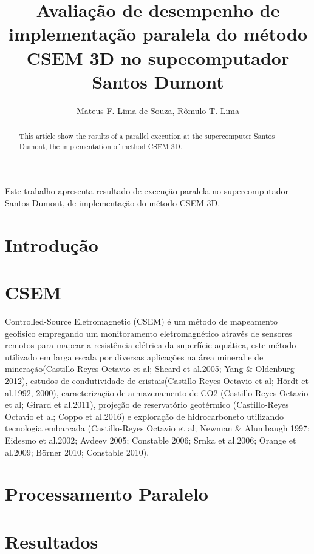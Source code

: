 \documentclass[12pt]{article}
\title{Avaliação de desempenho de implementação paralela do método CSEM 3D no supecomputador Santos Dumont}
\author{Mateus F. Lima de Souza\inst{1,2}, Rômulo T. Lima\inst{1,3}}
\begin{document}
 

\maketitle

\begin{abstract}
  This article show the results of a parallel execution at the supercomputer Santos Dumont, the implementation of method CSEM 3D.
\end{abstract}
     
\begin{resumo} 
  Este trabalho apresenta resultado de execução paralela no supercomputador Santos Dumont, de implementação do método CSEM 3D.
\end{resumo}


\section{Introdução}

\section{CSEM} \label{sec:firstpage}
Controlled-Source Eletromagnetic (CSEM) é um método de mapeamento geofisico empregando um monitoramento eletromagnético através de sensores remotos para mapear a resistência elétrica da superfície aquática, este método utilizado em larga escala por diversas aplicações na área mineral e de mineração(Castillo-Reyes
Octavio et al; Sheard et al.2005; Yang \& Oldenburg 2012), estudos de condutividade de cristais(Castillo-Reyes
Octavio et al; Hördt et al.1992, 2000), caracterização de armazenamento de CO2 (Castillo-Reyes
Octavio et al; Girard et al.2011), projeção de reservatório geotérmico (Castillo-Reyes
Octavio et al; Coppo et al.2016) e exploração de hidrocarboneto utilizando tecnologia embarcada (Castillo-Reyes
Octavio et al; Newman \& Alumbaugh 1997; Eidesmo et al.2002; Avdeev 2005; Constable 2006; Srnka et al.2006; Orange et al.2009; Börner 2010; Constable 2010). 
\section{Processamento Paralelo}

\section{Resultados}
\end{document}

